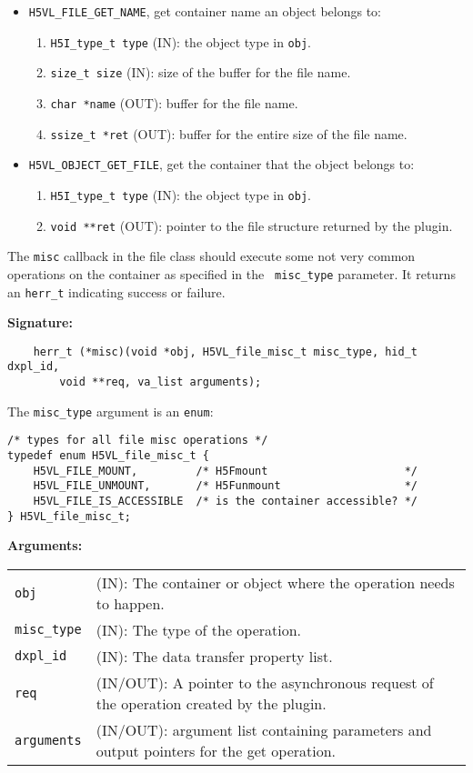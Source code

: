 \begin{itemize}
\item {\tt H5VL\_FILE\_GET\_NAME}, get container name an object
  belongs to:
  \begin{enumerate}
  \item {\tt H5I\_type\_t type} (IN): the object type in {\tt obj}.
  \item {\tt size\_t size} (IN): size of the buffer for the file name.
  \item {\tt char *name} (OUT): buffer for the file name.
  \item {\tt ssize\_t *ret} (OUT): buffer for the entire size of the
    file name.
  \end{enumerate}

\item {\tt H5VL\_OBJECT\_GET\_FILE}, get the container that the object
  belongs to:
  \begin{enumerate}
  \item {\tt H5I\_type\_t type} (IN): the object type in {\tt obj}.
  \item {\tt void **ret} (OUT): pointer to the file structure returned
    by the plugin.
  \end{enumerate}
\end{itemize}

The {\tt misc} callback in the file class should execute some not very
common operations on the container as specified in the {\tt
  misc\_type} parameter. It returns an {\tt herr\_t} indicating
success or failure.

\textbf{Signature:}
\begin{lstlisting}
    herr_t (*misc)(void *obj, H5VL_file_misc_t misc_type, hid_t dxpl_id, 
        void **req, va_list arguments);
\end{lstlisting}

The {\tt misc\_type} argument is an {\tt enum}:
\begin{lstlisting}
/* types for all file misc operations */
typedef enum H5VL_file_misc_t {
    H5VL_FILE_MOUNT,         /* H5Fmount                     */
    H5VL_FILE_UNMOUNT,       /* H5Funmount                   */
    H5VL_FILE_IS_ACCESSIBLE  /* is the container accessible? */
} H5VL_file_misc_t;
\end{lstlisting}

\textbf{Arguments:}\\
\begin{tabular}{l p{10cm}}
  {\tt obj} & (IN): The container or object where the operation needs
  to happen.\\
  {\tt misc\_type} & (IN): The type of the operation.\\
  {\tt dxpl\_id} & (IN): The data transfer property list.\\
  {\tt req} & (IN/OUT): A pointer to the asynchronous request of the
  operation created by the plugin.\\
  {\tt arguments} & (IN/OUT): argument list containing parameters and
  output pointers for the get operation. \\
\end{tabular}

